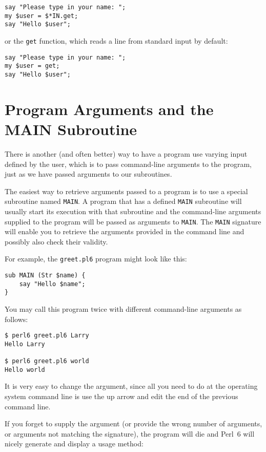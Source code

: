 \begin{verbatim}
say "Please type in your name: ";
my $user = $*IN.get;
say "Hello $user";
\end{verbatim}
%
or the {\tt get} function, which reads a line from standard 
input by default:
\begin{verbatim}
say "Please type in your name: ";
my $user = get;
say "Hello $user";
\end{verbatim}
%

\section{Program Arguments and the MAIN Subroutine}
\label{MAIN}

There is another (and often better) way to have a program 
use varying input defined by the user, which is to pass 
command-line arguments to the program, just as we have 
passed arguments to our subroutines.

The easiest way to retrieve arguments passed to a program is 
to use a special subroutine named \verb'MAIN'. A program that 
has a defined \verb'MAIN' subroutine will usually start its execution 
with that subroutine and the command-line arguments supplied 
to the program will be passed as arguments to \verb'MAIN'. 
The \verb'MAIN' signature will enable you to 
retrieve the arguments provided in the command line and 
possibly also check their validity.

For example, the {\tt greet.pl6} program might look like 
this:
\begin{verbatim}
sub MAIN (Str $name) {
    say "Hello $name";
}
\end{verbatim}

You may call this program twice with different command-line 
arguments as follows:

\begin{verbatim}
$ perl6 greet.pl6 Larry
Hello Larry

$ perl6 greet.pl6 world
Hello world
\end{verbatim}

It is very easy to change the argument, since all you need 
to do at the operating system command line is use the up arrow 
and edit the end of the previous command line.

If you forget to supply the argument (or provide the wrong 
number of arguments, or arguments not matching the signature), 
the program will die and Perl~6 will nicely generate and 
display a usage method:

